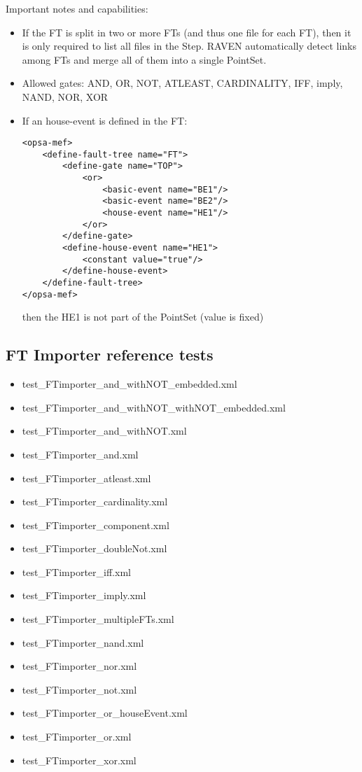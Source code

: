 Important notes and capabilities:
\begin{itemize}
	\item If the FT is split in two or more FTs (and thus one file for each FT), then it is only required to list 
	      all files in the Step. RAVEN automatically detect links among FTs and merge all of them into a single PointSet.
	\item Allowed gates: AND, OR, NOT, ATLEAST, CARDINALITY, IFF, imply, NAND, NOR, XOR
	\item If an house-event is defined in the FT:
\begin{lstlisting}[style=XML,morekeywords={anAttribute},caption=FT Importer input example: house-event., label=lst:FT_house event]
<opsa-mef>
    <define-fault-tree name="FT">
        <define-gate name="TOP">
            <or>
                <basic-event name="BE1"/>
                <basic-event name="BE2"/>
                <house-event name="HE1"/>
            </or>
        </define-gate>
        <define-house-event name="HE1">
        	<constant value="true"/>
        </define-house-event>
    </define-fault-tree>
</opsa-mef>
\end{lstlisting}
           then the HE1 is not part of the PointSet (value is fixed)
\end{itemize}

\subsection{FT Importer reference tests}
\begin{itemize}
	\item test\_FTimporter\_and\_withNOT\_embedded.xml
	\item test\_FTimporter\_and\_withNOT\_withNOT\_embedded.xml
	\item test\_FTimporter\_and\_withNOT.xml
	\item test\_FTimporter\_and.xml
	\item test\_FTimporter\_atleast.xml
	\item test\_FTimporter\_cardinality.xml
	\item test\_FTimporter\_component.xml
	\item test\_FTimporter\_doubleNot.xml
	\item test\_FTimporter\_iff.xml
	\item test\_FTimporter\_imply.xml
	\item test\_FTimporter\_multipleFTs.xml
	\item test\_FTimporter\_nand.xml
	\item test\_FTimporter\_nor.xml
	\item test\_FTimporter\_not.xml
	\item test\_FTimporter\_or\_houseEvent.xml
	\item test\_FTimporter\_or.xml
	\item test\_FTimporter\_xor.xml
\end{itemize}
